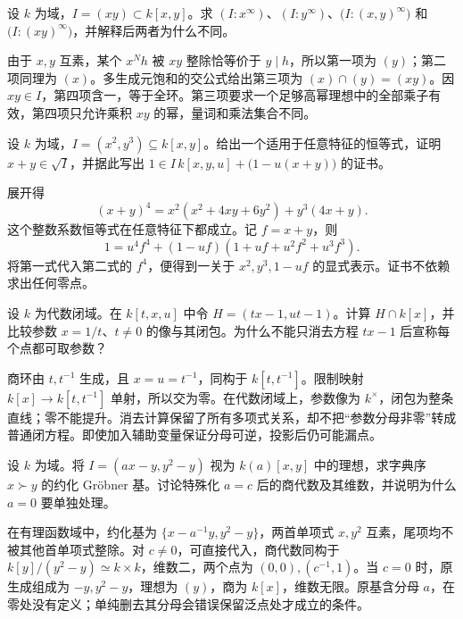 \begin{exercise}\label{b3:ex:08-saturation-components}
	设 \(k\) 为域，\(I=(xy)\subset k[x,y]\)。求 \((I:x^\infty)\)、\((I:y^\infty)\)、\(\bigl(I:(x,y)^\infty\bigr)\) 和 \(\bigl(I:(xy)^\infty\bigr)\)，并解释后两者为什么不同。
\end{exercise}
\begin{solution}
	由于 \(x,y\) 互素，某个 \(x^Nh\) 被 \(xy\) 整除恰等价于 \(y\mid h\)，所以第一项为 \((y)\)；第二项同理为 \((x)\)。多生成元饱和的交公式给出第三项为 \((x)\cap(y)=(xy)\)。因 \(xy\in I\)，第四项含一，等于全环。第三项要求一个足够高幂理想中的全部乘子有效，第四项只允许乘积 \(xy\) 的幂，量词和乘法集合不同。
\end{solution}

\begin{exercise}\label{b3:ex:08-radical-certificate}
	设 \(k\) 为域，\(I=(x^2,y^3)\subseteq k[x,y]\)。给出一个适用于任意特征的恒等式，证明 \(x+y\in\sqrt I\)，并据此写出 \(1\in I\,k[x,y,u]+\bigl(1-u(x+y)\bigr)\) 的证书。
\end{exercise}
\begin{solution}
	展开得
	\[
		(x+y)^4=x^2(x^2+4xy+6y^2)+y^3(4x+y).
	\]
	这个整数系数恒等式在任意特征下都成立。记 \(f=x+y\)，则
	\[
		1=u^4f^4+(1-uf)(1+uf+u^2f^2+u^3f^3).
	\]
	将第一式代入第二式的 \(f^4\)，便得到一关于 \(x^2,y^3,1-uf\) 的显式表示。证书不依赖求出任何零点。
\end{solution}

\begin{exercise}\label{b3:ex:08-rational-denominator}
	设 \(k\) 为代数闭域。在 \(k[t,x,u]\) 中令 \(H=(tx-1,ut-1)\)。计算 \(H\cap k[x]\)，并比较参数 \(x=1/t\)、\(t\ne0\) 的像与其闭包。为什么不能只消去方程 \(tx-1\) 后宣称每个点都可取参数？
\end{exercise}
\begin{solution}
	商环由 \(t,t^{-1}\) 生成，且 \(x=u=t^{-1}\)，同构于 \(k[t,t^{-1}]\)。限制映射 \(k[x]\to k[t,t^{-1}]\) 单射，所以交为零。在代数闭域上，参数像为 \(k^\times\)，闭包为整条直线；零不能提升。消去计算保留了所有多项式关系，却不把“参数分母非零”转成普通闭方程。即使加入辅助变量保证分母可逆，投影后仍可能漏点。
\end{solution}

\begin{exercise}\label{b3:ex:08-parameter-split}
	设 \(k\) 为域。将 \(I=(ax-y,y^2-y)\) 视为 \(k(a)[x,y]\) 中的理想，求字典序 \(x\succ y\) 的约化 Gröbner 基。讨论特殊化 \(a=c\) 后的商代数及其维数，并说明为什么 \(a=0\) 要单独处理。
\end{exercise}
\begin{solution}
	在有理函数域中，约化基为 \(\{x-a^{-1}y,y^2-y\}\)，两首单项式 \(x,y^2\) 互素，尾项均不被其他首单项式整除。对 \(c\ne0\)，可直接代入，商代数同构于 \(k[y]/(y^2-y)\simeq k\times k\)，维数二，两个点为 \((0,0),(c^{-1},1)\)。当 \(c=0\) 时，原生成组成为 \(-y,y^2-y\)，理想为 \((y)\)，商为 \(k[x]\)，维数无限。原基含分母 \(a\)，在零处没有定义；单纯删去其分母会错误保留泛点处才成立的条件。
\end{solution}

